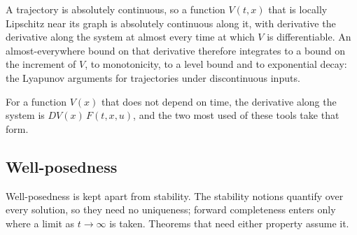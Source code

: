 
A trajectory is absolutely continuous, so a function $V(t, x)$ that is locally Lipschitz near its
graph is absolutely continuous along it, with derivative the derivative along the system at almost
every time at which $V$ is differentiable.  An almost-everywhere bound on that derivative therefore integrates to a bound on the
increment of $V$, to monotonicity, to a level bound and to exponential decay: the Lyapunov
arguments for trajectories under discontinuous inputs.








For a function $V(x)$ that does not depend on time, the derivative along the system is
$DV(x)\, F(t, x, u)$, and the two most used of these tools take that form.



\subsection{Well-posedness}

Well-posedness is kept apart from stability. The stability notions quantify over every solution,
so they need no uniqueness; forward completeness enters only where a limit as $t \to \infty$ is
taken. Theorems that need either property assume it.




